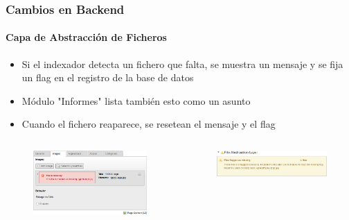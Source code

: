 \begin{frame}[fragile]
	\frametitle{Cambios en Backend}
	\framesubtitle{Capa de Abstracción de Ficheros}

	\begin{itemize}
		\item Si el indexador detecta un fichero que falta, se muestra un mensaje y se fija un flag en el registro de la base de datos
		\item Módulo "Informes" lista también esto como un asunto
		\item Cuando el fichero reaparece, se resetean el mensaje y el flag
	\end{itemize}

	\begin{columns}[T]

		\begin{column}{.5\textwidth}
			\begin{figure}
				\includegraphics[width=0.95\linewidth]{Images/BackendChanges/FalMissingFileContentElement.png}
			\end{figure}
		\end{column}

		\begin{column}{.5\textwidth}
			\begin{figure}
				\includegraphics[width=0.95\linewidth]{Images/BackendChanges/FalMissingFileReportsModule.png}
			\end{figure}
		\end{column}

	\end{columns}

\end{frame}

